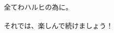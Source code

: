 \documentclass[a4paper,12pt,openany]{book}
\begin{document}
\thispagestyle{empty}\mbox{}{\textheight}\mbox{}\hfill\begin{minipage}{0.56\textwidth}%
\begin{CJK}{UTF8}{min}
全てわハルヒの為に。
\\
\\
それでは、楽しんで続けましょう！
\end{CJK}

\normalfont\end{minipage}
\end{document}

